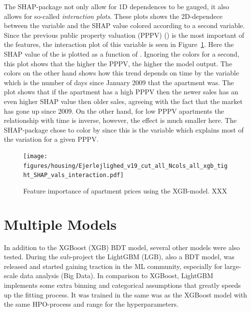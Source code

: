 The SHAP-package\citep{lundbergConsistentIndividualizedFeature2018} not only allow for 1D dependences to be gauged, it also allows for so-called \emph{interaction plots}. These plots shows the 2D-dependece between the variable and the SHAP value colored according to a second variable. Since the previous public property valuation (PPPV) () is the most important of the features, the interaction plot of this variable is seen in Figure~\ref{fig:h:shap_overview_interaction}. Here the SHAP value of the  is plotted as a function of . Ignoring the colors for a second, this plot shows that the higher the PPPV, the higher the model output. The colors on the other hand shows how this trend depends on time by the variable  which is the number of days since January  2009 that the apartment was. The plot shows that if the apartment has a high PPPV then the newer sales has an even higher SHAP value then older sales, agreeing with the fact that the market has gone up since 2009. On the other hand, for low PPPV apartments the relationship with time is inverse, however, the effect is much smaller here. The SHAP-package chose to color by  since this is the variable which explains most of the variation for a given PPPV. 

\begin{figure}[ht!]
  \centerfloat
  \texttt{[image: figures/housing/Ejerlejlighed\_v19\_cut\_all\_Ncols\_all\_xgb\_tight\_SHAP\_vals\_interaction.pdf]}
  \caption[Feature importance of apartments prices using XGB XXX]
          {Feature importance of apartment prices using the XGB-model. XXX
          } 
  \label{fig:h:shap_overview_interaction}
\end{figure}

\FloatBarrier
\section{Multiple Models}

In addition to the XGBoost \autocite{chenXGBoostScalableTree2016} (XGB) BDT model, several other models were also tested. During the sub-project the LightGBM \autocite{keLightGBMHighlyEfficient2017} (LGB), also a BDT model, was released and started gaining traction in the ML community, especially for large-scale data analysis (Big Data). In comparison to XGBoost, LightGBM implements some extra binning and categorical assumptions that greatly speeds up the fitting process. It was trained in the same was as the XGBoost model with the same HPO-process and range for the hyperparameters. 

